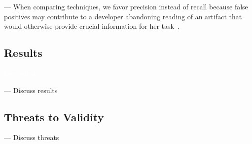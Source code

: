 --- When comparing techniques, we favor precision instead of recall because false positives may contribute to a developer abandoning reading of an artifact that would otherwise provide crucial information for her task~\cite{Rastkar2010}.


\subsection{Results}
\textcolor{white}{force ident} %

--- Discuss results \vspace{3mm}

\subsection{Threats to Validity}

--- Discuss threats \vspace{3mm}





